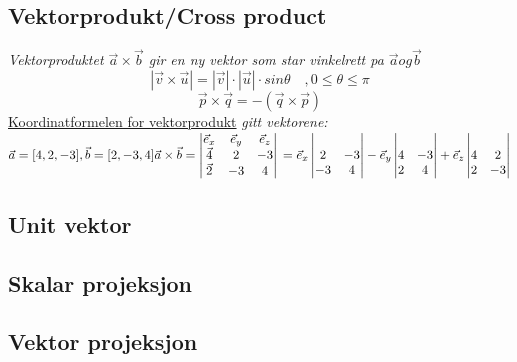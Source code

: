 \documentclass[12pt]{article}
\begin{document}
\subsection*{Vektorprodukt/Cross product}
{\em Vektorproduktet $\vec a \times \vec b$ gir en ny vektor som star vinkelrett pa $\vec a og \vec b$}
\[|\vec v \times \vec u | = |\vec v| \cdot |\vec u| \cdot sin \theta \quad, 0 \leq \theta \leq \pi\]
\[\vec p \times \vec q = -(\vec q \times \vec p)\]
\underline{Koordinatformelen for vektorprodukt}
\newline
{\em gitt vektorene:}
$
\vec a = [4,2,-3], \vec b = [2,-3,4]
\newline \vec a \times \vec b =
\begin{vmatrix}
\vec e_x&\vec e_y&\vec e_z\\
\vec 4&2&-3\\
\vec 2&-3&4\\
\end{vmatrix}
\newline
=\vec e_x
\begin{vmatrix}
\\2&-3
\\-3&4
\end{vmatrix}
-\vec e_y\begin{vmatrix}\\4&-3\\2&4\end{vmatrix}
+\vec e_z
\begin{vmatrix}
\\4&2
\\2&-3
\end{vmatrix}
$

\subsection{Unit vektor}

\subsection{Skalar projeksjon}

\subsection{Vektor projeksjon}
\[\]
\end{document}
